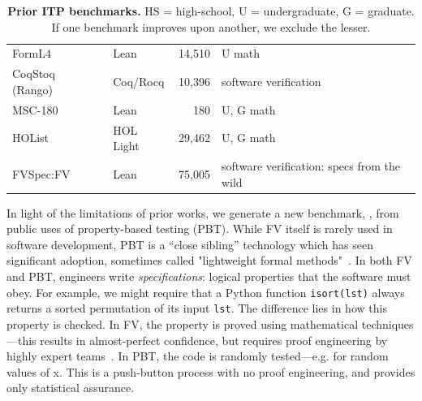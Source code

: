 \begin{table}[h]
\begin{tabularx}{\textwidth}{@{}
    >{\raggedright\arraybackslash}p{3.3cm}
    l
    r
    >{\raggedright\arraybackslash}X@{}}
FormL4~\cite{lu2024process}
  & Lean & 14{,}510 & U math \\
CoqStoq (Rango)~\cite{thompson2024rango}
  & Coq/Rocq & 10{,}396 & software verification \\
MSC-180~\cite{li2025msc}
  & Lean & 180 & U, G math \\
HOList~\cite{bansal2019holist}
  & HOL Light & 29{,}462 & U, G math \\
FVSpec:FV & Lean & 75{,}005 & software verification: specs from the wild \\ 
\bottomrule
\end{tabularx}
\caption{\textbf{Prior ITP benchmarks.} HS = high-school, U = undergraduate, G = graduate. If one benchmark improves upon another, we exclude the lesser.}
\label{tab:fv-benchmarks}
\end{table}

In light of the limitations of prior works, we generate a new benchmark, \FVSpec, from public uses of property-based testing (PBT). 
While FV itself is rarely used in software development, PBT is a ``close sibling'' technology which has seen significant adoption, sometimes called "lightweight formal methods"~\cite{JacksonWing1996}. In both FV and PBT, engineers write \emph{specifications}: logical properties that the software must obey. For example, we might require that a Python function \texttt{isort(lst)} always returns a sorted permutation of its input \texttt{lst}. The difference lies in how this property is checked. In FV, the property is proved using mathematical techniques---this results in almost-perfect confidence, but requires proof engineering by highly expert teams~\cite{dodds2022formally}. In PBT, the code is randomly tested---e.g. for random values of x. This is a push-button process with no proof engineering, and provides only statistical assurance.



